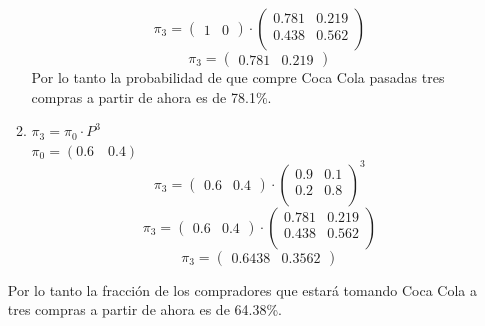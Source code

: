 \documentclass{templateNote}
\begin{document}
\begin{enumerate}
\begin{enumerate}[label=\alph*)]
\begin{equation*}
            \pi_3 = 
            \begin{pmatrix}
                1 & 0
            \end{pmatrix}
            \cdot
            \begin{pmatrix}
                0.781 & 0.219\\
                0.438 & 0.562\\
            \end{pmatrix}
        \end{equation*}
        \begin{equation*}
            \pi_3 = 
            \begin{pmatrix}
                0.781 & 0.219
            \end{pmatrix}
        \end{equation*}
        Por lo tanto la probabilidad de que compre Coca Cola pasadas tres compras a partir de ahora es de 78.1\%.
        \item $\pi_3 = \pi_0 \cdot P^3$\\
        $\pi_0 = (0.6 \quad 0.4)$
        \begin{equation*}
            \pi_3 = 
            \begin{pmatrix}
                0.6 & 0.4
            \end{pmatrix}
            \cdot
            \begin{pmatrix}
                0.9 & 0.1\\
                0.2 & 0.8\\
            \end{pmatrix}^3
        \end{equation*}
        \begin{equation*}
            \pi_3 = 
            \begin{pmatrix}
                0.6 & 0.4
            \end{pmatrix}
            \cdot
            \begin{pmatrix}
                0.781 & 0.219\\
                0.438 & 0.562\\
            \end{pmatrix}
        \end{equation*}
        \begin{equation*}
            \pi_3 = 
            \begin{pmatrix}
                0.6438 & 0.3562
            \end{pmatrix}
        \end{equation*}
    \end{enumerate}
    Por lo tanto la fracción de los compradores que estará tomando Coca Cola a tres compras a partir de ahora es de 64.38\%.
\end{enumerate}
\end{document}
